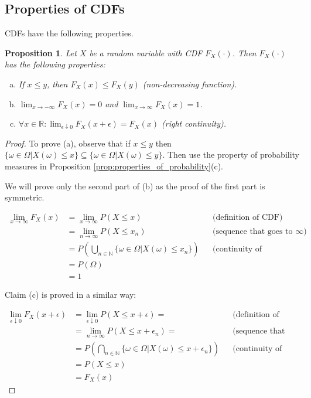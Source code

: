 \documentclass{book}
\theoremstyle{plain}%
\newtheorem{proposition}{Proposition}[section]
\theoremstyle{definition}
\newlength{\arrow}
\begin{document}
\subsection*{Properties of CDFs}

CDFs have the following properties.

\begin{proposition}
Let $X$ be a random variable with CDF $F_X(\cdot)$. Then $F_X(\cdot)$ has the following properties:
\begin{enumerate}[(a)]
\item If $x \leq y$, then $F_X(x) \leq F_X(y)$ \textit{(non-decreasing function)}.
\item $\lim_{x \rightarrow -\infty} F_X(x) = 0$ and $\lim_{x \rightarrow \infty} F_X(x) = 1$.
\item $\forall x \in \mathbb{R}: \lim_{\epsilon \downarrow 0} F_X(x + \epsilon) = F_X(x)$ \textit{(right continuity)}.
\end{enumerate}\label{prop:CDF}
\end{proposition}

\begin{proof}
To prove (a), observe that if $x \leq y$ then $\{\omega \in \Omega | X(\omega) \leq x\} \subseteq \{\omega \in \Omega | X(\omega) \leq y\}$.   Then use the property of probability measures in Proposition \ref{prop:properties_of_probability}(c).

We will prove only the second part of (b) as the proof of the first part is symmetric.

\begin{align*}
    \lim_{x \rightarrow \infty} F_X(x) &= \lim_{x \rightarrow \infty} P(X \leq x) && \text{(definition of CDF)} \\
    &= \lim_{n \rightarrow \infty} P(X \leq x_n) && \text{(sequence that goes to $\infty$)} \\
    &= P(\bigcup_{n \in \mathbb{N}} \{\omega \in \Omega | X(\omega) \leq x_n\}) && \text{(continuity of probability)}\\
    &= P(\Omega) \\
    &= 1
\end{align*}

Claim (c) is proved in a similar way:

\begin{align*}
    \lim_{\epsilon \downarrow 0} F_X(x + \epsilon) &= \lim_{\epsilon \downarrow 0} P(X \leq x + \epsilon) = && \text{(definition of CDF)} \\
    &= \lim_{n \rightarrow \infty} P(X \leq x + \epsilon_n) = && \text{(sequence that goes to 0)} \\
    &= P(\bigcap_{n \in \mathbb{N}} \{\omega \in \Omega | X(\omega) \leq x + \epsilon_n\}) && \text{(continuity of probability)}\\
    &= P(X \leq x) \\
    &= F_X(x)
\end{align*}

\end{proof}
\end{document}
